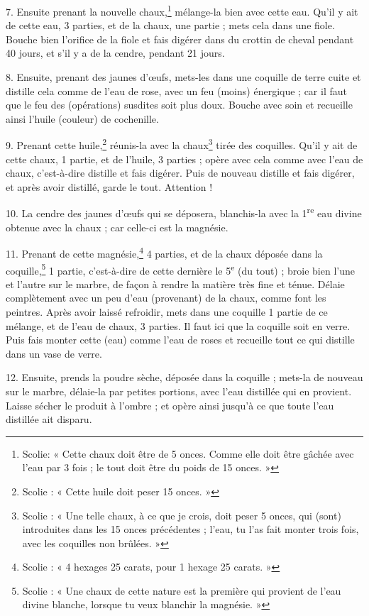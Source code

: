 \documentclass[a4paper, 11pt, oneside, polutonikogreek, french]{article}
\begin{document}
7. Ensuite prenant la nouvelle chaux,\footnote{Scolie: « Cette chaux doit être de 5 onces. Comme elle doit être gâchée avec l'eau par 3 fois ; le tout doit être du poids de 15 onces. »} mélange-la bien avec cette eau. Qu'il y ait de cette eau, 3 parties, et de la chaux, une partie ; mets cela dans une fiole. Bouche bien l'orifice de la fiole et fais digérer dans du crottin de cheval pendant 40 jours, et s'il y a de la cendre, pendant 21 jours.

8. Ensuite, prenant des jaunes d'œufs, mets-les dans une coquille de terre cuite et distille cela comme de l'eau de rose, avec un feu (moins) énergique ; car il faut que le feu des (opérations) susdites soit plus doux. Bouche avec soin et recueille ainsi l'huile (couleur) de cochenille.

9. Prenant cette huile,\footnote{Scolie : « Cette huile doit peser 15 onces. »} réunis-la avec la chaux\footnote{Scolie : « Une telle chaux, à ce que je crois, doit peser 5 onces, qui (sont) introduites dans les 15 onces précédentes ; l'eau, tu l'as fait monter trois fois, avec les coquilles non brûlées. »} tirée des coquilles. Qu'il y ait de cette chaux, 1 partie, et de l'huile, 3 parties ; opère avec cela comme avec l'eau de chaux, c'est-à-dire distille et fais digérer. Puis de nouveau distille et fais digérer, et après avoir distillé, garde le tout. Attention !

10. La cendre des jaunes d'œufs qui se déposera, blanchis-la avec la 1\textsuperscript{re} eau divine obtenue avec la chaux ; car celle-ci est la magnésie.

11. Prenant de cette magnésie,\footnote{Scolie : « 4 hexages 25 carats, pour 1 hexage 25 carats. »} 4 parties, et de la chaux déposée dans la coquille,\footnote{Scolie : « Une chaux de cette nature est la première qui provient de l'eau divine blanche, lorsque tu veux blanchir la magnésie. »} 1 partie, c'est-à-dire de cette dernière le 5\textsuperscript{e} (du tout) ; broie bien l'une et l'autre sur le marbre, de façon à rendre la matière très fine et ténue. Délaie complètement avec un peu d'eau (provenant) de la chaux, comme font les peintres. Après avoir laissé refroidir, mets dans une coquille 1 partie de ce mélange, et de l'eau de chaux, 3 parties. Il faut ici que la coquille soit en verre. Puis fais monter cette (eau) comme l'eau de roses et recueille tout ce qui distille dans un vase de verre.

12. Ensuite, prends la poudre sèche, déposée dans la coquille ; mets-la de nouveau sur le marbre, délaie-la par petites portions, avec l'eau distillée qui en provient. Laisse sécher le produit à l'ombre ; et opère ainsi jusqu'à ce que toute l'eau distillée ait disparu.
\end{document}
